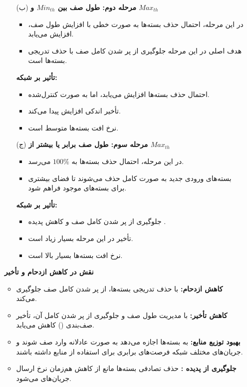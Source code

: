 \begin{enumerate}
	\item [ ]
	\begin{qsolve}
			
		\begin{enumerate}
			\item [(ب)] \textbf{{مرحله دوم: طول صف بین \( Min_{th} \) و \( Max_{th} \)}}
			\begin{itemize}
				\item در این مرحله، احتمال حذف بسته‌ها به صورت خطی با افزایش طول صف، افزایش می‌یابد.
				\item هدف اصلی در این مرحله جلوگیری از پر شدن کامل صف با حذف تدریجی بسته‌ها است.
			\end{itemize}
			\textbf{تأثیر بر شبکه:}
			\begin{itemize}
				\item احتمال حذف بسته‌ها افزایش می‌یابد، اما به صورت کنترل‌شده.
				\item تأخیر اندکی افزایش پیدا می‌کند.
				\item نرخ افت بسته‌ها متوسط است.
			\end{itemize}
			
			
			
			\item [(ج)] \textbf{{مرحله سوم: طول صف برابر یا بیشتر از \( Max_{th} \)}}
			\begin{itemize}
				\item در این مرحله، احتمال حذف بسته‌ها به \( 100\% \) می‌رسد.
				\item بسته‌های ورودی جدید به صورت کامل حذف می‌شوند تا فضای بیشتری برای بسته‌های موجود فراهم شود.
			\end{itemize}
			\textbf{تأثیر بر شبکه:}
			\begin{itemize}
				\item جلوگیری از پر شدن کامل صف و کاهش پدیده .
				\item تأخیر در این مرحله بسیار زیاد است.
				\item نرخ افت بسته‌ها بسیار بالا است.
			\end{itemize}
		\end{enumerate}
		
		
		
		\textbf{{نقش  در کاهش ازدحام و تأخیر}}
		\begin{itemize}
			\item \textbf{کاهش ازدحام:}  با حذف تدریجی بسته‌ها، از پر شدن کامل صف جلوگیری می‌کند.
			\item \textbf{کاهش تأخیر:} با مدیریت طول صف و جلوگیری از پر شدن کامل آن، تأخیر صف‌بندی () کاهش می‌یابد.
			\item \textbf{بهبود توزیع منابع:}  به بسته‌ها اجازه می‌دهد به صورت عادلانه وارد صف شوند و جریان‌های مختلف شبکه فرصت‌های برابری برای استفاده از منابع داشته باشند.
			\item \textbf{جلوگیری از پدیده :} حذف تصادفی بسته‌ها مانع از کاهش هم‌زمان نرخ ارسال جریان‌های  می‌شود.
		\end{itemize}
	\end{qsolve}
\end{enumerate}